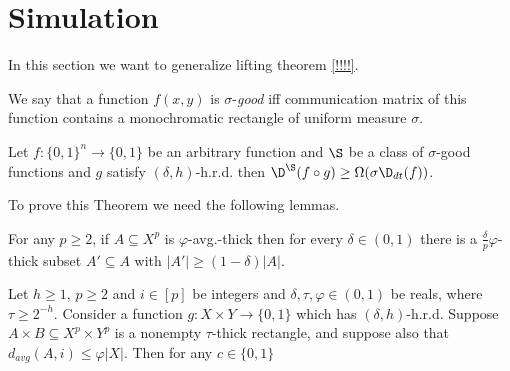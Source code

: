 \section{Simulation}

In this section we want to generalize lifting theorem \ref{!!!!}.

\begin{definition}
    We say that a function $f(x, y)$ is $\sigma$-\textit{good} iff communication matrix of this function
    contains a monochromatic rectangle of uniform measure $\sigma$. 
\end{definition}


\begin{theorem}
    Let $f:\{0, 1\}^n \to \{0, 1\}$ be an arbitrary function and $\S$ be a class of $\sigma$-good
    functions and $g$ satisfy $(\delta, h)$-h.r.d. then $\D^{\S}(f \circ g) \ge \Omega(\sigma \D_{dt}(f))$.
\end{theorem}

To prove this Theorem we need the following lemmas.

\begin{lemma}
    For any $p \ge 2$, if $A \subseteq X^p$ is $\varphi$-avg.-thick then for every $\delta \in (0, 1)$
    there is a $\frac{\delta}{p} \varphi$-thick subset $A' \subseteq A$ with $|A'| \ge (1 - \delta)
    |A|$.
\end{lemma}


\begin{lemma}[\cite{!!!!}]
    Let $h \ge 1$, $p \ge 2$ and $i \in [p]$ be integers and $\delta, \tau, \varphi \in (0, 1)$ be reals,
    where $\tau \ge 2^{-h}$. Consider a function $g: X \times Y \to \{0, 1\}$ which has $(\delta,
    h)$-h.r.d. Suppose $A \times B \subseteq X^p \times Y^p$ is a nonempty $\tau$-thick rectangle, and
    suppose also that $d_{avg}(A, i) \le \varphi |X|$. Then for any $c \in \{0, 1\}$
\end{lemma}